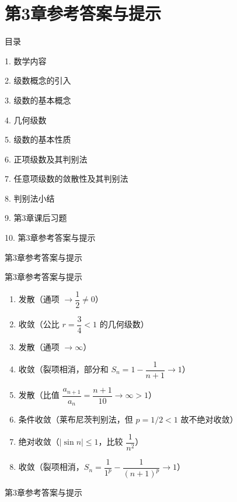 \documentclass[aspectratio=169,10pt,fontset=fandol]{ctexbeamer}
\begin{document}
\section{第3章参考答案与提示}
\begin{frame}[t,fragile]{目录}
\normalsize
{\color{black}\normalsize 1. 数学内容\par}\vspace{0.3em}
{\color{black}\normalsize 2. 级数概念的引入\par}\vspace{0.3em}
{\color{black}\normalsize 3. 级数的基本概念\par}\vspace{0.3em}
{\color{black}\normalsize 4. 几何级数\par}\vspace{0.3em}
{\color{black}\normalsize 5. 级数的基本性质\par}\vspace{0.3em}
{\color{black}\normalsize 6. 正项级数及其判别法\par}\vspace{0.3em}
{\color{black}\normalsize 7. 任意项级数的敛散性及其判别法\par}\vspace{0.3em}
{\color{black}\normalsize 8. 判别法小结\par}\vspace{0.3em}
{\color{black}\normalsize 9. 第3章课后习题\par}\vspace{0.3em}
{\color{blue}\normalsize 10. 第3章参考答案与提示\par}\vspace{0.3em}
\end{frame}
\begin{frame}[t,fragile]{第3章参考答案与提示}
\footnotesize
{\footnotesize


}
\end{frame}
\begin{frame}[t,fragile]{第3章参考答案与提示}
\footnotesize
{\footnotesize
\begin{enumerate}
\item 发散（通项 \(\to \dfrac12 \neq 0\)）
\item 收敛（公比 \(r = \dfrac34 < 1\) 的几何级数）
\item 发散（通项 \(\to \infty\)）
\item 收敛（裂项相消，部分和 \(S_n = 1 - \dfrac{1}{n+1} \to 1\)）
\item 发散（比值 \(\dfrac{a_{n+1}}{a_n} = \dfrac{n+1}{10} \to \infty > 1\)）
\item 条件收敛（莱布尼茨判别法，但 \(p=1/2 < 1\) 故不绝对收敛）
\item 绝对收敛（\(|\sin n| \leq 1\)，比较 \(\dfrac{1}{n^2}\)）
\item 收敛（裂项相消，\(S_n = \dfrac{1}{1^p} - \dfrac{1}{(n+1)^p} \to 1\)）
\end{enumerate}
}
\end{frame}
\begin{frame}[t,fragile]{第3章参考答案与提示}
\footnotesize
{\footnotesize


\fi


}
\end{frame}
\end{document}
